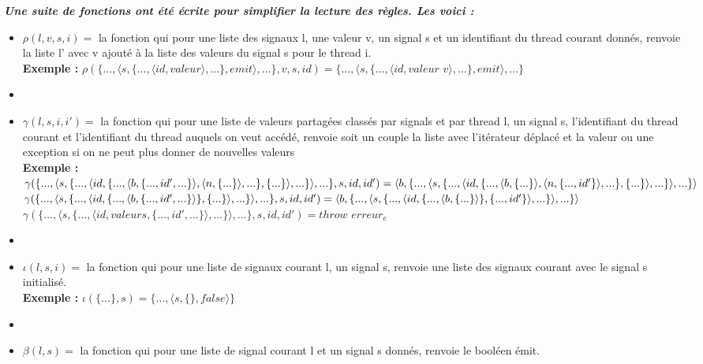 \documentclass[10pt,a4paper]{article}
\begin{document}
			\textbf{\textit{Une suite de fonctions ont été écrite pour simplifier la lecture des règles. Les voici :}}
			\smallbreak
			\begin{itemize}
				\item[] $\rho(l,v,s,i) =$ la fonction qui pour une liste des signaux l, une valeur v, un signal s et un identifiant du thread courant donnés, renvoie la liste l' avec v ajouté à la liste des valeurs du signal s pour le thread i.
				\\\textbf{Exemple :} $\rho(\{...,\langle s,\{...,\langle id,valeur\rangle,...\},emit\rangle,...\},v,s,id) = \{...,\langle s,\{...,\langle id,valeur$ $v\rangle,...\},emit\rangle,...\}$
				\item[] 
				\item[] $\gamma(l,s,i,i') =$ la fonction qui pour une liste de valeurs partagées classés par signals et par thread l, un signal s, l'identifiant du thread courant et l'identifiant du thread auquels on veut accédé, renvoie soit un couple la liste avec l'itérateur déplacé et la valeur ou une exception si on ne peut plus donner de nouvelles valeurs 
				\\\textbf{Exemple :}
				\\$\gamma(\{...,\langle s,\{...,\langle id,\{...,\langle b,\{...,id',...\}\rangle,\langle n,\{...\}\rangle,...\},\{...\}\rangle,...\}\rangle,...\},s,id,id') = 
				\\\langle b , \{...,\langle s,\{...,\langle id,\{...,\langle b,\{...\}\rangle,\langle n,\{...,id'\}\rangle,...\},\{...\}\rangle,...\}\rangle,...\} \rangle$
				\medbreak
				$\gamma(\{...,\langle s,\{...,\langle id,\{...,\langle b,\{...,id',...\}\rangle\},\{...\}\rangle,...\}\rangle,...\},s,id,id') = 
				\\\langle b , \{...,\langle s,\{...,\langle id,\{...,\langle b,\{...\}\rangle\},\{...,id'\}\rangle,...\}\rangle,...\} \rangle$
				\medbreak
				$\gamma(\{...,\langle s,\{...,\langle id,valeurs,\{...,id',...\}\rangle,...\}\rangle,...\},s,id,id') = throw$ $erreur_{e}$
				\item[]
				\item[] $\iota(l,s,i) =$ la fonction qui pour une liste de signaux courant l, un signal s, renvoie une liste des signaux courant avec le signal s initialisé.
				\\\textbf{Exemple :} $\iota(\{...\},s) = \{...,\langle s,\{\},false\rangle\}$
				\item[]
				\item[] $\beta(l,s) =$ la fonction qui pour une liste de signal courant l et un signal s donnés, renvoie le booléen émit.

\end{itemize}
\end{document}
